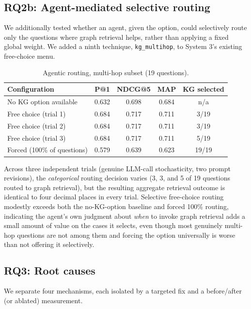 \documentclass[sigconf,anonymous,review]{acmart}
\begin{document}
\subsection{RQ2b: Agent-mediated selective routing}
\label{sec:agentic}

We additionally tested whether an agent, given the option, could selectively route only the questions where graph retrieval helps, rather than applying a fixed global weight. We added a ninth technique, \texttt{kg\_multihop}, to System 3's existing free-choice menu.

\begin{table}[t]
\caption{Agentic routing, multi-hop subset (19 questions).}
\label{tab:agentic}
\begin{tabular}{lcccc}
\toprule
Configuration & P@1 & NDCG@5 & MAP & KG selected \\
\midrule
No KG option available     & 0.632 & 0.698 & 0.684 & n/a \\
Free choice (trial 1)       & 0.684 & 0.717 & 0.711 & 3/19 \\
Free choice (trial 2)       & 0.684 & 0.717 & 0.711 & 3/19 \\
Free choice (trial 3)       & 0.684 & 0.717 & 0.711 & 5/19 \\
Forced (100\% of questions) & 0.579 & 0.639 & 0.623 & 19/19 \\
\bottomrule
\end{tabular}
\end{table}

Across three independent trials (genuine LLM-call stochasticity, two prompt revisions), the \emph{categorical} routing decision varies (3, 3, and 5 of 19 questions routed to graph retrieval), but the resulting aggregate retrieval outcome is identical to four decimal places in every trial. Selective free-choice routing modestly exceeds both the no-KG-option baseline and forced 100\% routing, indicating the agent's own judgment about \emph{when} to invoke graph retrieval adds a small amount of value on the cases it selects, even though most genuinely multi-hop questions are not among them and forcing the option universally is worse than not offering it selectively.

\subsection{RQ3: Root causes}
\label{sec:rootcause}

We separate four mechanisms, each isolated by a targeted fix and a before/after (or ablated) measurement.
\end{document}
